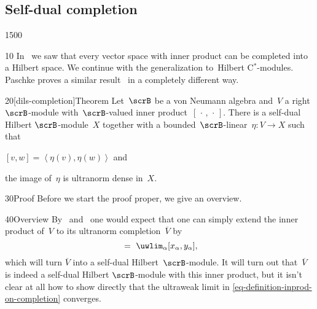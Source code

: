 \subsection{Self-dual completion}
\begin{parsec}{1500}%
\begin{point}{10}%
In~
    we saw that every vector space with inner product
    can be completed into a Hilbert space.
We continue with the generalization to~Hilbert C$^*$-modules.
Paschke proves a similar result~\cite[thm.~3.2]{paschke}
    in a completely different way.
\end{point}
\begin{point}{20}[dils-completion]{Theorem}%
Let~$\scrB$ be a von Neumann algebra
and~$V$ a right~$\scrB$-module with~$\scrB$-valued
    inner product~$[\,\cdot\,,\,\cdot\,]$.
There is a self-dual Hilbert $\scrB$-module~$X$
    together with a bounded~$\scrB$-linear~$\eta\colon V \to X$
    such that \begin{inparaenum}
    \item $[v,w] = \left<\eta (v),\eta(w)\right>$
    and \item the image of~$\eta$ is ultranorm dense in~$X$.
    \end{inparaenum}
\begin{point}{30}{Proof}%
Before we start the proof proper,
    we give an overview.
\begin{point}{40}{Overview}
By~ and~
    one would expect that
    one can simply extend the inner product of~$V$
    to its ultranorm completion~$\overline{V}$
    by
    \begin{equation}
        [(x_\alpha)_\alpha, (y_\alpha)_\alpha] \ =\  \uwlim_\alpha [x_\alpha,y_\alpha], \label{eq-definition-inprod-on-completion}
    \end{equation}
    which will turn $\overline{V}$ into a self-dual Hilbert~$\scrB$-module.
It will turn out that~$\overline{V}$
    is indeed a self-dual Hilbert $\scrB$-module
    with this inner product,
    but it isn't clear at all  how to show directly that the ultraweak limit
    in \eqref{eq-definition-inprod-on-completion} converges.


\end{point}
\end{point}
\end{point}
\end{parsec}
